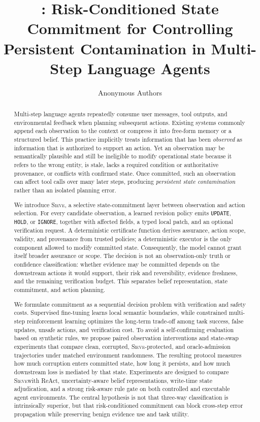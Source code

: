 \documentclass{article}
\title{\method: Risk-Conditioned State Commitment for Controlling Persistent Contamination in Multi-Step Language Agents}
\author{Anonymous Authors}
\newcommand{\method}{\textsc{Sieve}}
\newcommand{\update}{\texttt{UPDATE}}
\newcommand{\hold}{\texttt{HOLD}}
\newcommand{\ignore}{\texttt{IGNORE}}
\begin{document}
\maketitle

\begin{abstract}
Multi-step language agents repeatedly consume user messages, tool outputs, and environmental feedback when planning subsequent actions. Existing systems commonly append each observation to the context or compress it into free-form memory or a structured belief. This practice implicitly treats information that has been \emph{observed} as information that is authorized to support an action. Yet an observation may be semantically plausible and still be ineligible to modify operational state because it refers to the wrong entity, is stale, lacks a required condition or authoritative provenance, or conflicts with confirmed state. Once committed, such an observation can affect tool calls over many later steps, producing \emph{persistent state contamination} rather than an isolated planning error.

We introduce \method, a selective state-commitment layer between observation and action selection. For every candidate observation, a learned revision policy emits \update, \hold, or \ignore, together with affected fields, a typed local patch, and an optional verification request. A deterministic certificate function derives assurance, action scope, validity, and provenance from trusted policies; a deterministic executor is the only component allowed to modify committed state. Consequently, the model cannot grant itself broader assurance or scope. The decision is not an observation-only truth or confidence classification: whether evidence may be committed depends on the downstream actions it would support, their risk and reversibility, evidence freshness, and the remaining verification budget. This separates belief representation, state commitment, and action planning.

We formulate commitment as a sequential decision problem with verification and safety costs. Supervised fine-tuning learns local semantic boundaries, while constrained multi-step reinforcement learning optimizes the long-term trade-off among task success, false updates, unsafe actions, and verification cost. To avoid a self-confirming evaluation based on synthetic rules, we propose paired observation interventions and state-swap experiments that compare clean, corrupted, \method-protected, and oracle-admission trajectories under matched environment randomness. The resulting protocol measures how much corruption enters committed state, how long it persists, and how much downstream loss is mediated by that state. Experiments are designed to compare \method with ReAct, uncertainty-aware belief representations, write-time state adjudication, and a strong risk-aware rule gate on both controlled and executable agent environments. The central hypothesis is not that three-way classification is intrinsically superior, but that risk-conditioned commitment can block cross-step error propagation while preserving benign evidence use and task utility.
\end{abstract}
\end{document}
